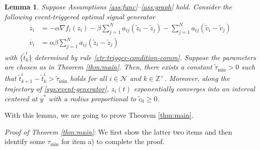 \documentclass[sort&compress]{IEEEtran}
\newcommand{\lm}{\lambda}
\newcommand{\N}{\mathcal{N}}
\newtheorem{lem}{Lemma}
\begin{document}
\begin{lem}\label{lem:generator-comm}
	Suppose Assumptions \ref{ass:func}--\ref{ass:graph} hold. Consider the following event-triggered optimal signal generator
	\begin{align}\label{sys:event-generator}
		\dot{z_i}&= -\alpha \nabla f_i(z_i)-\beta \sum_{j=1}^{N}a_{ij}(\tilde  z_i- \tilde z_j)-\sum_{j=1}^{N} a_{ij}(\tilde v_i-\tilde v_j) \nonumber \\
		\dot{v_i} &=\alpha \beta \sum_{j=1}^{N}a_{ij}( \tilde z_i-\tilde z_j)%
	\end{align}
	with $\{\tilde t_{k}^{i}\}$ determined by rule \eqref{ctr:trigger-condition-comm}. 
	Suppose the parameters are chosen as in Theorem \ref{thm:main}. %
	Then, there exists a constant ${\tilde \tau}_{\min}>0$ such that $\tilde t^i_{k+1}-\tilde t^i_k >\tilde \tau_{\min}$ holds for all $i\in \N$ and $k\in \mathbb{Z}^+$. Moreover, along the trajectory of  \eqref{sys:event-generator}, $z_i(t)$ exponentially converges into an interval centered at $y^*$  with a radius proportional to $\tilde c_0\geq 0$.  
\end{lem}

With this lemma, we are going to prove Theorem \ref{thm:main}. 

{\it Proof of Theorem \ref{thm:main}}: We first show the latter two items and then identify some ${\tau}_{\min}$ for item a) to complete the proof.
\end{document}
